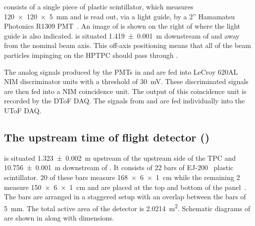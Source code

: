\STwo consists of a single piece of plastic scintillator, which measures \SI{120 x 120 x 5}{\milli\metre} and is read out, via a light guide, by a 2'' Hamamatsu Photonics R1309 PMT~\cite{hamamatsu}.
An image of \STwo is shown on the right of  where the light guide is also indicated.
\STwo is situated \SI{1.419(1)}{\metre} downstream of \SOne and away from the nominal beam axis.
This off-axis positioning means that all of the beam particles impinging on the HPTPC should pass through \STwo.

The analog signals produced by the PMTs in \SOne and \STwo are fed into LeCroy 620AL NIM discriminator units with a threshold of \SI{30}{\milli\volt}.
These discriminated signals are then fed into a NIM coincidence unit.
The output of this coincidence unit is recorded by the DToF DAQ.
The signals from \SOne and \STwo are fed individually into the UToF DAQ.

\subsection{The upstream time of flight detector (\SThree)}
\label{sec:hptpc_beam_flux:overview:s3}

\SThree is situated \SI{1.323(2)}{\metre} upstream of the upstream side of the TPC and \SI{10.756(1)}{\metre} downstream of \SOne.
It consists of 22 bars of EJ-200~\cite{ej200} plastic scintillator.
20 of these bars measure \SI{168 x 6 x 1}{\centi\metre} while the remaining 2 measure \SI{150 x 6 x 1}{\centi\metre} and are placed at the top and bottom of the panel~\cite{s3Paper}.
The bars are arranged in a staggered setup with an overlap between the bars of \SI{5}{\milli\metre}.
The total active area of the detector is \SI{2.0214}{\metre\squared}.
Schematic diagrams of \SThree are shown in  along with dimensions.

